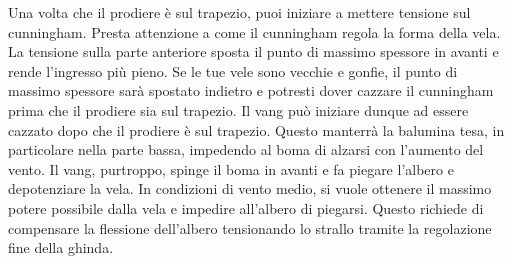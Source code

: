 Una volta che il prodiere è sul trapezio, puoi iniziare a mettere tensione sul
cunningham. Presta attenzione a come il cunningham regola la forma della vela.
La tensione sulla parte anteriore sposta il punto di massimo spessore in avanti
e rende l'ingresso più pieno. Se le tue vele sono vecchie e gonfie, il punto di
massimo spessore sarà spostato indietro e potresti dover cazzare il cunningham
prima che il prodiere sia sul trapezio. Il vang può iniziare dunque ad essere
cazzato dopo che il prodiere è sul trapezio. Questo manterrà la balumina tesa,
in particolare nella parte bassa, impedendo al boma di alzarsi con l'aumento del
vento. Il vang, purtroppo, spinge il boma in avanti e fa piegare l'albero e
depotenziare la vela. In condizioni di vento medio, si vuole ottenere il massimo
potere possibile dalla vela e impedire all'albero di piegarsi. Questo richiede
di compensare la flessione dell'albero tensionando lo strallo tramite la
regolazione fine della ghinda.


